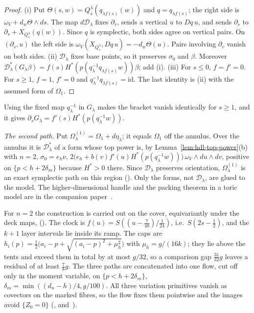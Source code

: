 \begin{proof}
(i) Put $\Theta(s,w)=Q^\lambda_s(q_{\lambda f(s)}(w))$ and $q=q_{\lambda f(s)}$; the right side is $\omega_V+d_w\Theta\wedge ds$. The map $d\mathcal D_\lambda$ fixes $\partial_v$, sends a vertical $u$ to $Dq\,u$, and sends $\partial_s$ to $\partial_s+X_{Q^\lambda_s}(q(w))$. Since $q$ is symplectic, both sides agree on vertical pairs. On $(\partial_s,u)$ the left side is $\omega_V(X_{Q^\lambda_s},Dq\,u)=-d_w\Theta(u)$. Pairs involving $\partial_v$ vanish on both sides.
(ii) $\mathcal D_\lambda$ fixes base points, so it preserves $\sigma_0$ and $\beta$. Moreover $\mathcal D_\lambda^*(G_\lambda\beta)=f(s)H^*(p(q_\lambda^{-1}q_{\lambda f(s)}w))\beta$; add (i).
(iii) For $s\le0$, $f=f'=0$. For $s\ge1$, $f=1$, $f'=0$ and $q_\lambda^{-1}q_{\lambda f(s)}=\mathrm{id}$. The last identity is (ii) with the assumed form of $\Omega_1$.
\end{proof}

Using the fixed map $q_\lambda^{-1}$ in $G_\lambda$ makes the bracket vanish identically for $s\ge1$, and it gives $\partial_sG_\lambda=f'(s)H^*(p(q_\lambda^{-1}w))$.

\emph{The second path.} Put $\Omega^{(1)}_\lambda=\Omega_1+d\eta_\lambda$; it equals $\Omega_1$ off the annulus. Over the
annulus it is $\mathcal D_\lambda^*$ of a form whose top power is, by Lemma~\ref{lem:hdl-top-power}(b) with $n=2$,
$\sigma_0=e_h\nu$, $2\bigl(e_h+b(v)f'(u)H^*(p(q_\lambda^{-1}w))\bigr)\,\omega_V\wedge du\wedge dv$, positive on
$\{p<h+2\delta_m\}$ because $H^*>0$ there. Since $\mathcal D_\lambda$ preserves orientation, $\Omega^{(1)}_\lambda$ is an
exact symplectic path on this region (). Only the forms, not $\mathcal D_\lambda$,
are glued to the model. The higher-dimensional handle and the packing theorem in a toric model are in the companion
paper~\cite{SongHD}.

\begin{remark}\label{rem:hdl-four}
For $n=2$ the construction is carried out on the cover, equivariantly under the deck maps, (). The clock is $f(u)=S((u-\frac7{48})/\frac1{24})$, i.e.\ $S(2s-\frac12)$, and the $k+1$ layer
intervals lie inside its ramp. The caps are $h_i(p)=\frac12\bigl(a_i-p+\sqrt{(a_i-p)^2+\mu_h^2}\bigr)$ with
$\mu_h=g/(16k)$; they lie above the tents and exceed them in total by at most $g/32$, so a comparison gap
$\frac{31}{32}g$ leaves a residual of at least $\frac78g$. The three paths are concatenated into one flow, cut off only
in the moment variable, on $\{p<h+2\delta_m\}$, $\delta_m=\min((d_n-h)/4,g/100)$. All three variation primitives vanish
as covectors on the marked fibres, so the flow fixes them pointwise and the images avoid $\{Z_0=0\}$
(,  and~).
\end{remark}

